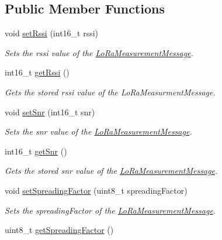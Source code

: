 \subsection*{Public Member Functions}
\begin{DoxyCompactItemize}
\item 
void \hyperlink{class_lo_ra_measurement_message_ae7926bece980f29a8bfa7a0ef47545c8}{set\+Rssi} (int16\+\_\+t rssi)
\begin{DoxyCompactList}\small\item\em Sets the rssi value of the \hyperlink{class_lo_ra_measurement_message}{Lo\+Ra\+Measurement\+Message}. \end{DoxyCompactList}\item 
int16\+\_\+t \hyperlink{class_lo_ra_measurement_message_a647be5e5801453888ef3ffceab4ed40d}{get\+Rssi} ()
\begin{DoxyCompactList}\small\item\em Gets the stored rssi value of the Lo\+Ra\+Measurment\+Message. \end{DoxyCompactList}\item 
void \hyperlink{class_lo_ra_measurement_message_ab5a4889834f40d339011efe99f68e925}{set\+Snr} (int16\+\_\+t snr)
\begin{DoxyCompactList}\small\item\em Sets the snr value of the \hyperlink{class_lo_ra_measurement_message}{Lo\+Ra\+Measurement\+Message}. \end{DoxyCompactList}\item 
int16\+\_\+t \hyperlink{class_lo_ra_measurement_message_aed0d810e3f8ef617a3c05fa793f4d0a1}{get\+Snr} ()
\begin{DoxyCompactList}\small\item\em Gets the stored snr value of the \hyperlink{class_lo_ra_measurement_message}{Lo\+Ra\+Measurement\+Message}. \end{DoxyCompactList}\item 
void \hyperlink{class_lo_ra_measurement_message_a2d33032664e8bbb0114c9c3e356fc0d8}{set\+Spreading\+Factor} (uint8\+\_\+t spreading\+Factor)
\begin{DoxyCompactList}\small\item\em Sets the spreading\+Factor of the \hyperlink{class_lo_ra_measurement_message}{Lo\+Ra\+Measurement\+Message}. \end{DoxyCompactList}\item 
uint8\+\_\+t \hyperlink{class_lo_ra_measurement_message_a595910a38d9c65c56e75b15ba972430c}{get\+Spreading\+Factor} ()

\end{DoxyCompactItemize}
